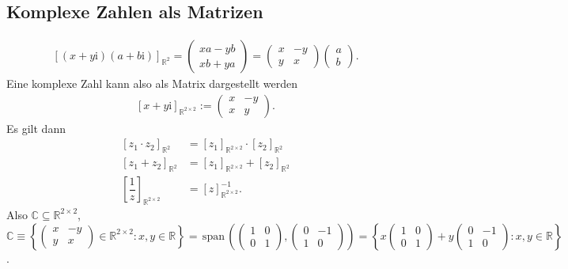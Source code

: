 \documentclass[a4paper,12pt]{article}
\numberwithin{equation}{section}
\begin{document}
\subsection{Komplexe Zahlen als Matrizen}
\begin{align} 
        \left[\left(x+y\text{i}\right)\left(a+b\text{i}\right)\right]_{\mathbb{R}^{2}}=\begin{pmatrix}
                xa-yb\\xb+ya
        \end{pmatrix}=\begin{pmatrix}
        x&-y\\y&x
        \end{pmatrix}\begin{pmatrix}
                a\\b
        \end{pmatrix}
.\end{align} 
Eine komplexe Zahl kann also als Matrix dargestellt werden
\begin{align} 
        \left[x+y\text{i}\right]_{\mathbb{R}^{2\times 2}}:=\begin{pmatrix}
                x&-y\\x&y
        \end{pmatrix}
.\end{align} 
Es gilt dann
\begin{align} 
        \left[z_1\cdot z_2\right]_{\mathbb{R}^2}&=\left[z_1\right]_{\mathbb{R}^{2\times 2}}\cdot \left[z_2\right]_{\mathbb{R}^{2}}\\
        \left[z_1+z_2\right]_{\mathbb{R}^2}&=\left[z_1\right]_{\mathbb{R}^{2\times 2}}+\left[z_2\right]_{\mathbb{R}^{2}}\\
        \left[\dfrac{1}{z}\right]_{\mathbb{R}^{2\times 2}}&=\left[z\right]_{\mathbb{R}^{2\times 2}}^{-1}
.\end{align} 
Also $\mathbb{C}\subseteq \mathbb{R}^{2\times 2}$, $\mathbb{C}\equiv \left\{\begin{pmatrix}
                x&-y\\y&x
\end{pmatrix} \in \mathbb{R}^{2\times 2}:x,y \in \mathbb{R}\right\}=\,\text{span}\,\left(\begin{pmatrix}
                1&0\\0&1
\end{pmatrix},\begin{pmatrix}
                0&-1\\1&0
\end{pmatrix}\right)=\left\{x \begin{pmatrix}
                1&0\\0&1
\end{pmatrix}+y \begin{pmatrix}
                0&-1\\1&0
\end{pmatrix}:x,y \in \mathbb{R}\right\}$.\\\indent
\end{document}
